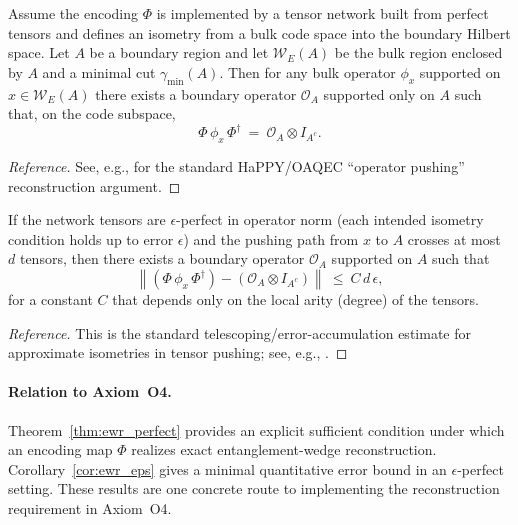 \begin{theorem}
\label{thm:ewr_perfect}
Assume the encoding $\Phi$ is implemented by a tensor network built from perfect tensors and defines an isometry from a bulk code space into the boundary Hilbert space. Let $A$ be a boundary region and let $\mathcal{W}_E(A)$ be the bulk region enclosed by $A$ and a minimal cut $\gamma_{\min}(A)$. Then for any bulk operator $\phi_x$ supported on $x\in\mathcal{W}_E(A)$ there exists a boundary operator $\mathcal{O}_A$ supported only on $A$ such that, on the code subspace,
\begin{equation}
    \Phi\,\phi_x\,\Phi^\dagger\ =\ \mathcal{O}_A\otimes I_{A^c}.
\end{equation}
\end{theorem}
\begin{proof}[Reference]
See, e.g., \cite{Pastawski2015,Harlow2017} for the standard HaPPY/OAQEC ``operator pushing'' reconstruction argument.
\end{proof}

\begin{corollary}
\label{cor:ewr_eps}
If the network tensors are $\epsilon$-perfect in operator norm (each intended isometry condition holds up to error $\epsilon$) and the pushing path from $x$ to $A$ crosses at most $d$ tensors, then there exists a boundary operator $\mathcal{O}_A$ supported on $A$ such that
\begin{equation}
    \left\|\left(\Phi\,\phi_x\,\Phi^\dagger\right)-\left(\mathcal{O}_A\otimes I_{A^c}\right)\right\|\ \le\ C\,d\,\epsilon,
\end{equation}
for a constant $C$ that depends only on the local arity (degree) of the tensors.
\end{corollary}
\begin{proof}[Reference]
This is the standard telescoping/error-accumulation estimate for approximate isometries in tensor pushing; see, e.g., \cite{Harlow2017}.
\end{proof}

\paragraph{Relation to Axiom~O4.}
Theorem~\ref{thm:ewr_perfect} provides an explicit sufficient condition under which an encoding map $\Phi$ realizes exact entanglement-wedge reconstruction. Corollary~\ref{cor:ewr_eps} gives a minimal quantitative error bound in an $\epsilon$-perfect setting. These results are one concrete route to implementing the reconstruction requirement in Axiom~O4.

